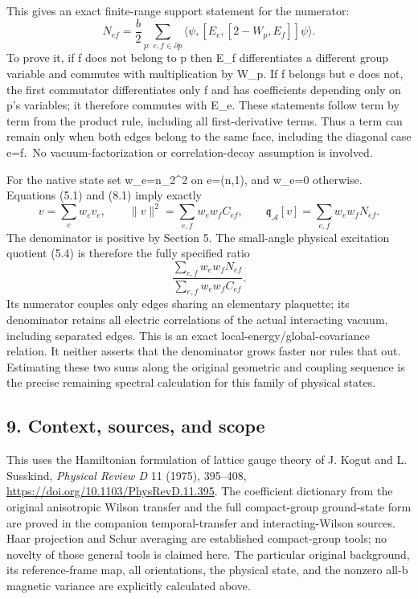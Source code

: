\documentclass[
  11pt,
]{article}
\begin{document}
This gives an exact finite-range support statement for the numerator: \[
 N_{ef}=\frac b2\sum_{p:\ e,f\in\partial p}
 \langle\psi,[E_e,[2-W_p,E_f]]\psi\rangle.
\tag{8.3}
\] To prove it, if f does not belong to p then E\_f differentiates a
different group variable and commutes with multiplication by W\_p. If f
belongs but e does not, the first commutator differentiates only f and
has coefficients depending only on p's variables; it therefore commutes
with E\_e. These statements follow term by term from the product rule,
including all first-derivative terms. Thus a term can remain only when
both edges belong to the same face, including the diagonal case e=f.~No
vacuum-factorization or correlation-decay assumption is involved.

For the native state set w\_e=n\_2\^{}2 on e=(n,1), and w\_e=0
otherwise. Equations (5.1) and (8.1) imply exactly \[
 v=\sum_e w_ev_e,\qquad
 \|v\|^2=\sum_{e,f}w_ew_fC_{ef},\qquad
 \mathfrak q_{\mathcal A}[v]=\sum_{e,f}w_ew_fN_{ef}.
\tag{8.4}
\] The denominator is positive by Section 5. The small-angle physical
excitation quotient (5.4) is therefore the fully specified ratio \[
 \boxed{\frac{\sum_{e,f}w_ew_fN_{ef}}
              {\sum_{e,f}w_ew_fC_{ef}}.}
\tag{8.5}
\] Its numerator couples only edges sharing an elementary plaquette; its
denominator retains all electric correlations of the actual interacting
vacuum, including separated edges. This is an exact
local-energy/global-covariance relation. It neither asserts that the
denominator grows faster nor rules that out. Estimating these two sums
along the original geometric and coupling sequence is the precise
remaining spectral calculation for this family of physical states.

\subsection{9. Context, sources, and
scope}\label{magnetic-part-1-context-sources-and-scope}

This uses the Hamiltonian formulation of lattice gauge theory of J.
Kogut and L. Susskind, \emph{Physical Review D} 11 (1975), 395--408,
\url{https://doi.org/10.1103/PhysRevD.11.395}. The coefficient
dictionary from the original anisotropic Wilson transfer and the full
compact-group ground-state form are proved in the companion
temporal-transfer and interacting-Wilson sources. Haar projection and
Schur averaging are established compact-group tools; no novelty of those
general tools is claimed here. The particular original background, its
reference-frame map, all orientations, the physical state, and the
nonzero all-b magnetic variance are explicitly calculated above.
\end{document}

